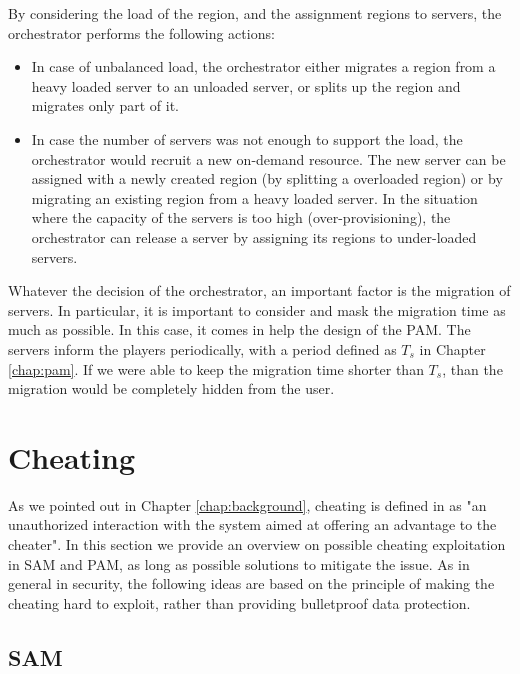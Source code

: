 \documentclass[final,10pt,a5paper]{phdimt}
\theoremstyle{definition}
\begin{document}
By considering the load of the region, and the assignment regions to servers, the orchestrator performs the following actions:

\begin{itemize}
\item In case of unbalanced load, the orchestrator either migrates a region from a heavy loaded server to an unloaded server, or splits up the region and migrates only part of it.
\item In case the number of servers was not enough to support the load, the orchestrator would recruit a new on-demand resource. The new server can be assigned with a newly created region (by splitting a overloaded region) or by migrating an existing region from a heavy loaded server. In the situation where the capacity of the servers is too high (over-provisioning), the orchestrator can release a server by assigning its regions to under-loaded servers.
\end{itemize}


Whatever the decision of the orchestrator, an important factor is the migration of servers.
In particular, it is important to consider and mask the migration time as much as possible.
In this case, it comes in help the design of the PAM.
The servers inform the players periodically, with a period defined as $T_s$ in Chapter \ref{chap:pam}.
If we were able to keep the migration time shorter than $T_s$, than the migration would be completely hidden from the user.




\section{Cheating}

As we pointed out in Chapter \ref{chap:background}, cheating is defined in \cite{Neumann2007} as "an unauthorized interaction with the system aimed at offering an advantage to the cheater".
In this section we provide an overview on possible cheating exploitation in SAM and PAM, as long as possible solutions to mitigate the issue. 
As in general in security, the following ideas are based on the principle of making the cheating hard to exploit, rather than providing bulletproof data protection.


\subsection{SAM}
\end{document}
